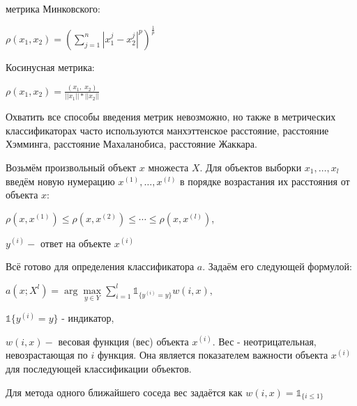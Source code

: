 \documentclass[a4paper,titlepage]{article}
\begin{document}
метрика Минковского:

\begin{center}
$\rho(x_1, x_2) = \left ( \sum \limits^n_{j = 1} {|x_1^j - x^j_2|}^p \right ) ^{\frac{1}{p}}$
\end{center}

Косинусная метрика:

\begin{center}
$\rho(x_1, x_2) = \frac{(x_1, \; x_2)}{||x_1|| * ||x_2||}$
\end{center}

Охватить все способы введения метрик невозможно, но также в метрических классификаторах часто используются манхэттенское расстояние, расстояние Хэмминга, расстояние Махаланобиса, расстояние Жаккара.
\newpage




Возьмём произвольный объект $x$ множеста $X$. Для объектов выборки $x_1, \ldots, x_l$ введём новую нумерацию $x^{(1)}, \ldots, x^{(l)}$ в порядке возрастания их расстояния от объекта $x$:

\begin{center}
$\rho(x, x^{(1)}) \leqslant \rho(x, x^{(2)})  \leqslant \cdots \leqslant \rho(x, x^{(l)}) $,
\end{center}

$y^{(i)} -$ ответ на объекте $x^{(i)}$

Всё готово для определения классификатора $a$. Задаём его следующей формулой:

\begin{center}
$a(x;X^l) = \arg \max \limits_{y \in Y}  \sum \limits^l_{i = 1} \mathds{1}_{\{y^{(i)} = y\}} w(i, x),$
\end{center}

$\mathds{1}\{y^{(i)} = y\}$ - индикатор,

$w(i, x) -$ весовая функция (вес) объекта $x^{(i)}$. Вес - неотрицательная, невозрастающая по $i$ функция. Она является показателем важности объекта $x^{(i)}$ для последующей классификации объектов.

Для метода одного ближайшего соседа вес задаётся как $w(i, x) = \mathds{1}_{\{i \leqslant 1\}}$
\end{document}
